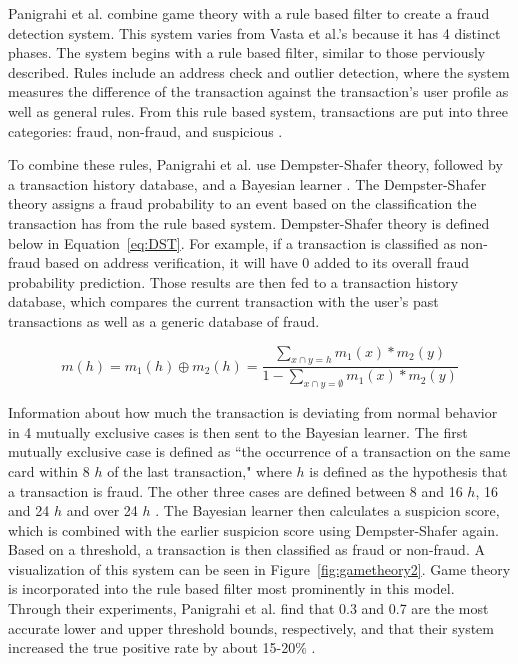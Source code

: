\documentclass[midd]{thesis}
\begin{document}
Panigrahi et al. combine game theory with a rule based filter to create a fraud detection system. This system varies from Vasta et al.'s because it has 4 distinct phases. The system begins with a rule based filter, similar to those perviously described. Rules include an address check and outlier detection, where the system measures the difference of the transaction against the transaction's user profile as well as general rules. From this rule based system, transactions are put into three categories: fraud, non-fraud, and suspicious \cite{Panigrahi2009}. 

To combine these rules, Panigrahi et al. use Dempster-Shafer theory, followed by a transaction history database, and a Bayesian learner \cite{Panigrahi2009}. The Dempster-Shafer theory assigns a fraud probability to an event based on the classification the transaction has from the rule based system. Dempster-Shafer theory is defined below in Equation~\ref{eq:DST}.  For example, if a transaction is classified as non-fraud based on address verification, it will have 0 added to its overall fraud probability prediction. Those results are then fed to a transaction history database, which compares the current transaction with the user's past transactions as well as a generic database of fraud. 

\begin{equation}
\label{eq:DST}
m(h) = m_{1}(h)\oplus m_{2}(h) = {\frac {\sum _{x\cap y=h}m_{1}(x) * m_{2}(y)} {1 - \sum _{x\cap y=\emptyset }m_{1}(x) * m_{2}(y) }}
\end{equation}


Information about how much the transaction is deviating from normal behavior in 4 mutually exclusive cases is then sent to the Bayesian learner. The first mutually exclusive case is defined as ``the occurrence of a transaction on the same card within 8 $h$ of the last transaction," where $h$ is defined as the hypothesis that a transaction is fraud. The other three cases are defined between 8 and 16 $h$, 16 and 24 $h$ and over 24 $h$ \cite{Panigrahi2009}.  The Bayesian learner then calculates a suspicion score, which is combined with the earlier suspicion score using Dempster-Shafer again. Based on a threshold, a transaction is then classified as fraud or non-fraud. A visualization of this system can be seen in Figure~\ref{fig:gametheory2}. Game theory is incorporated into the rule based filter most prominently in this model. Through their experiments, Panigrahi et al. find that 0.3 and 0.7 are the most accurate lower and upper threshold bounds, respectively, and that their system increased the true positive rate by about 15-20\% \cite{Panigrahi2009}. 
\end{document}
